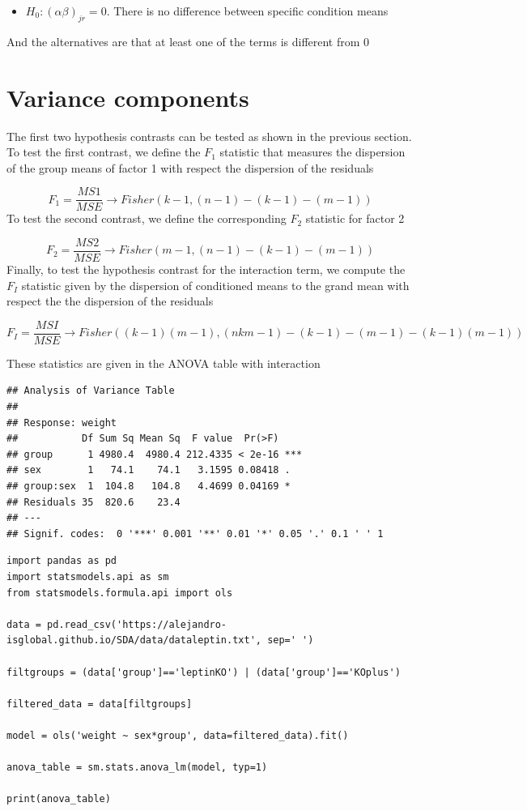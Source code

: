 \documentclass[
]{book}
\providecommand{\tightlist}{%
  \setlength{\itemsep}{0pt}\setlength{\parskip}{0pt}}
\begin{document}
\begin{itemize}
\tightlist
\item
  \(H_0: (\alpha\beta)_{jr}=0\). There is no difference between specific condition means
\end{itemize}

And the alternatives are that at least one of the terms is different from \(0\)

\hypertarget{variance-components-1}{%
\section{Variance components}\label{variance-components-1}}

The first two hypothesis contrasts can be tested as shown in the previous section. To test the first contrast, we define the \(F_1\) statistic that measures the dispersion of the group means of factor 1 with respect the dispersion of the residuals

\[F_1=\frac{MS1}{MSE} \rightarrow Fisher(k-1,(n-1)-(k-1)-(m-1))\]
To test the second contrast, we define the corresponding \(F_2\) statistic for factor 2

\[F_2=\frac{MS2}{MSE} \rightarrow Fisher(m-1,(n-1)-(k-1)-(m-1))\]
Finally, to test the hypothesis contrast for the interaction term, we compute the \(F_I\) statistic given by the dispersion of conditioned means to the grand mean with respect the the dispersion of the residuals

\[F_I=\frac{MSI}{MSE}\rightarrow Fisher((k-1)(m-1),(nkm-1) -(k-1)-(m-1)-(k-1)(m-1))\]

These statistics are given in the ANOVA table with interaction

\begin{verbatim}
## Analysis of Variance Table
## 
## Response: weight
##           Df Sum Sq Mean Sq  F value  Pr(>F)    
## group      1 4980.4  4980.4 212.4335 < 2e-16 ***
## sex        1   74.1    74.1   3.1595 0.08418 .  
## group:sex  1  104.8   104.8   4.4699 0.04169 *  
## Residuals 35  820.6    23.4                     
## ---
## Signif. codes:  0 '***' 0.001 '**' 0.01 '*' 0.05 '.' 0.1 ' ' 1
\end{verbatim}

\begin{verbatim}
import pandas as pd
import statsmodels.api as sm
from statsmodels.formula.api import ols

data = pd.read_csv('https://alejandro-isglobal.github.io/SDA/data/dataleptin.txt', sep=' ')

filtgroups = (data['group']=='leptinKO') | (data['group']=='KOplus')

filtered_data = data[filtgroups]

model = ols('weight ~ sex*group', data=filtered_data).fit()

anova_table = sm.stats.anova_lm(model, typ=1)

print(anova_table)
\end{verbatim}
\end{document}
